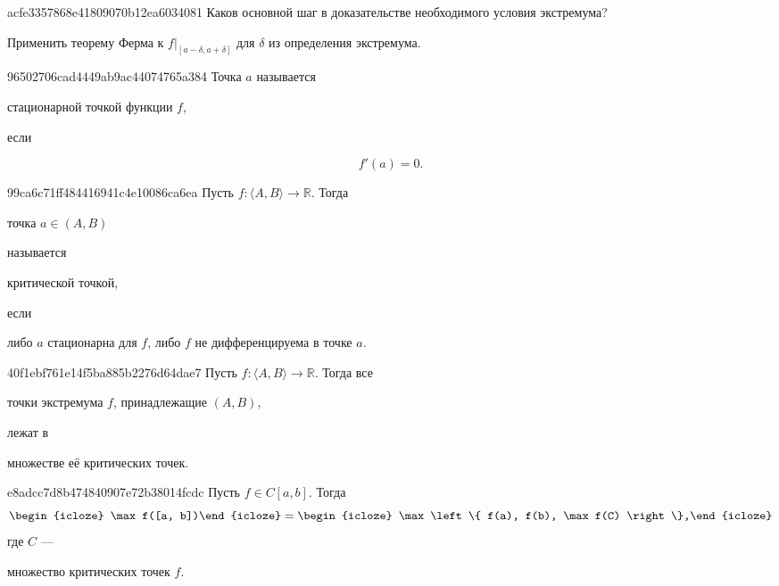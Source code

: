 \begin{note}{acfe3357868e41809070b12ea6034081}
    Каков основной шаг в доказательстве необходимого условия экстремума?

    \begin{cloze}{1}
        Применить теорему Ферма к \( f|_{[a - \delta, a + \delta]}  \) для \( \delta \) из определения экстремума.
    \end{cloze}
\end{note}

\begin{note}{96502706cad4449ab9ac44074765a384}
    Точка \( a \) называется \begin{icloze}{1}стационарной точкой функции \( f \),\end{icloze} если
    \begin{icloze}{2}\[
        f'(a) = 0.
    \]\end{icloze}
\end{note}

\begin{note}{99ca6c71ff484416941c4e10086ca6ea}
    Пусть \( f : \langle A, B \rangle \to \mathbb R \). Тогда
    \begin{icloze}{1}точка \( a \in (A, B) \)\end{icloze} называется \begin{icloze}{2}критической
    точкой,\end{icloze} если \begin{icloze}{1}либо \( a \) стационарна для \( f \), либо \(
    f \) не дифференцируема в точке \( a \).\end{icloze}
\end{note}

\begin{note}{40f1ebf761e14f5ba885b2276d64dae7}
    Пусть \( f : \langle A, B \rangle \to \mathbb R  \). Тогда все
    \begin{icloze}{2}точки экстремума \( f \), принадлежащие \( (A, B) \),\end{icloze}
    лежат в \begin{icloze}{1}множестве её критических точек.\end{icloze}
\end{note}

\begin{note}{e8adcc7d8b474840907e72b38014fcdc}
    Пусть \( f \in C[a, b] \). Тогда
    \[
        \begin{icloze}{3}\max f([a, b])\end{icloze} = \begin{icloze}{1}\max \left\{ f(a), f(b), \max f(C) \right\},\end{icloze}
    \]
    где \( C \) --- \begin{icloze}{2}множество критических точек \( f \).\end{icloze}
\end{note}

